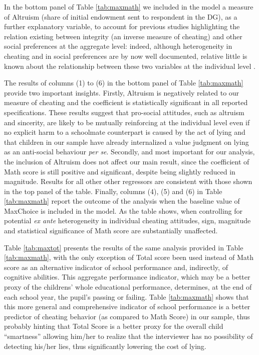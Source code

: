 \documentclass[authoryear, preprint, review, 12pt]{elsarticle}
\begin{document}


In the bottom panel of Table \ref{tab:maxmath} we included in the model a measure of Altruism (share of initial endowment sent to respondent in the DG), as a further explanatory variable, to account for previous studies highlighting the relation existing between integrity (an inverse measure of cheating) and other social preferences at the aggregate level: indeed, although heterogeneity in cheating and in social preferences are by now well documented, relative little is known about the relationship between these two variables at the individual level \citep[p. 2]{kerschbamer2017altruists}. 

The results of columns (1) to (6) in the bottom panel of Table \ref{tab:maxmath} provide two important insights. Firstly, Altruism is negatively related to our measure of cheating and the coefficient is statistically significant in all reported specifications. These results suggest that pro-social attitudes, such as altruism and sincerity, are likely to be mutually reinforcing at the individual level even if no explicit harm to a schoolmate counterpart is caused by the act of lying and that children in our sample have already internalized a value judgment on lying as an anti-social behaviour \textit{per se}. Secondly, and most important for our analysis, the inclusion of Altruism does not affect our main result, since the coefficient of Math score is still positive and significant, despite being slightly reduced in magnitude. 
Results for all other other regressors are consistent with those shown in the top panel of the table. Finally, columns (4), (5) and (6) in Table \ref{tab:maxmath} report the outcome of the analysis when the baseline value of MaxChoice is included in the model. As the table shows, when controlling for potential \textit{ex ante} heterogeneity in individual cheating attitudes, sign, magnitude and statistical significance of Math score are substantially unaffected.

Table \ref{tab:maxtot} presents the results of the same analysis provided in Table \ref{tab:maxmath}, with the only exception of Total score been used instead of Math score as an alternative indicator of school performance and, indirectly, of cognitive abilities. This aggregate performance indicator, which may be a better proxy of the childrens' whole educational performance, determines, at the end of each school year, the pupil's passing or failing. Table \ref{tab:maxmath} shows that this more general and comprehensive indicator of school performance is a better predictor of cheating behavior (as compared to Math Score) in our sample, thus probably hinting that Total Score is a better proxy for the overall child \enquote{smartness} allowing him/her to realize that the interviewer has no possibility of detecting his/her lies, thus significantly lowering the cost of lying.
\end{document}
